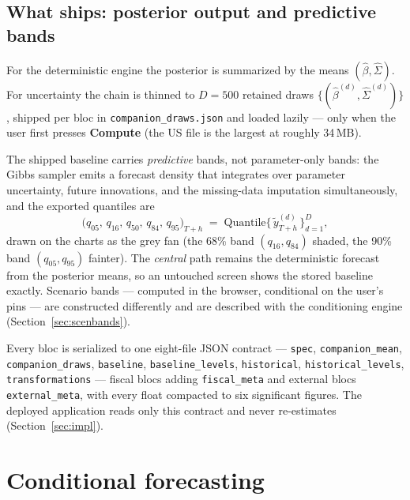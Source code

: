 \documentclass[11pt]{article}
\newcommand{\ui}[1]{\textbf{#1}}
\theoremstyle{plain}
\theoremstyle{remark}
\begin{document}
\subsection{What ships: posterior output and predictive bands}\label{sec:bands}

For the deterministic engine the posterior is summarized by the means
$(\hat\beta, \hat\Sigma)$. For uncertainty the chain is thinned to
$D = 500$ retained draws $\{(\hat\beta^{(d)}, \hat\Sigma^{(d)})\}$,
shipped per bloc in \texttt{companion\_draws.json} and loaded lazily ---
only when the user first presses \ui{Compute} (the US file is the
largest at roughly 34\,MB).

The shipped baseline carries \emph{predictive} bands, not
parameter-only bands: the Gibbs sampler emits a forecast density that
integrates over parameter uncertainty, future innovations, and the
missing-data imputation simultaneously, and the exported quantiles are
\begin{equation}\label{eq:bands}
  \bigl(q_{05},\,q_{16},\,q_{50},\,q_{84},\,q_{95}\bigr)_{T+h}
  \;=\; \mathrm{Quantile}\bigl\{\, \tilde{y}^{(d)}_{T+h} \,\bigr\}_{d=1}^{D},
\end{equation}
drawn on the charts as the grey fan (the 68\% band $(q_{16},q_{84})$
shaded, the 90\% band $(q_{05},q_{95})$ fainter). The \emph{central}
path remains the deterministic forecast from the posterior means, so an
untouched screen shows the stored baseline exactly. Scenario bands ---
computed in the browser, conditional on the user's pins --- are
constructed differently and are described with the conditioning engine
(Section~\ref{sec:scenbands}).

Every bloc is serialized to one eight-file JSON contract ---
\texttt{spec}, \texttt{companion\_mean}, \texttt{companion\_draws},
\texttt{baseline}, \texttt{baseline\_levels}, \texttt{historical},
\texttt{historical\_levels}, \texttt{transformations} --- fiscal blocs
adding \texttt{fiscal\_meta} and external blocs
\texttt{external\_meta}, with
every float compacted to six significant figures. The deployed
application reads only this contract and never re-estimates
(Section~\ref{sec:impl}).

\section{Conditional forecasting}\label{sec:cond}
\end{document}

